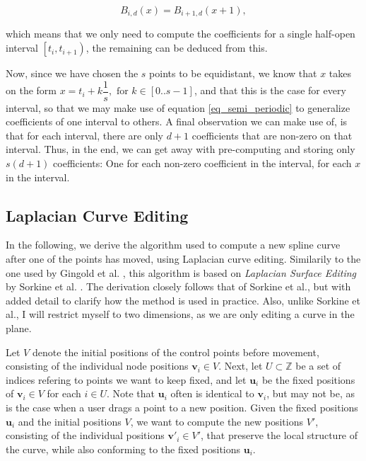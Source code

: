 \documentclass[english]{article}
\begin{document}
\begin{equation} \label{eq_semi_periodic}
B_{i,d}(x) = B_{i + 1,d}(x + 1),
\end{equation}

which means that we only need to compute the coefficients for a
  single half-open interval $\left[{t_i, t_{i + 1}}\right)$, the remaining can be deduced from this.
    
    Now, since we have chosen the $s$ points to be equidistant, we know that $x$ takes on the form $x = t_i + k \dfrac{1}{s}, \text{ for } k \in [0..{s-1}]$, and that this is the case for every interval, so that we may make use of equation \ref{eq_semi_periodic} to generalize coefficients of one interval to others. A final observation we can make use of, is that for each interval, there are only $d + 1$ coefficients that are non-zero on that interval. Thus, in the end, we can get away with pre-computing and storing only $s(d + 1)$ coefficients: One for each non-zero coefficient in the interval, for each $x$ in the interval.
    

\subsection{Laplacian Curve Editing} \label{section_laplacian}

In the following, we derive the algorithm used to compute a new spline curve after one of the points has moved, using Laplacian curve editing. Similarily to the one used by Gingold et al. \cite{gingold09}, this algorithm is based on \textit{Laplacian Surface Editing} by Sorkine et al. \cite{sorkine04}. The derivation closely follows that of Sorkine et al., but with added detail to clarify how the method is used in practice. Also, unlike Sorkine et al., I will restrict myself to two dimensions, as we are only editing a curve in the plane.

Let $V$ denote the initial positions of the control points before movement, consisting of the individual node positions $\mathbf{v}_i \in V$. Next, let $U \subset \mathbb{Z}$ be a set of indices refering to points we want to keep fixed, and let $\mathbf{u}_i$ be the fixed positions of $\mathbf{v}_i \in V$ for each $ i \in U$. Note that $\mathbf{u}_i$ often is identical to $\mathbf{v}_i$, but may not be, as is the case when a user drags a point to a new position. Given the fixed positions $\mathbf{u}_i$ and the initial positions $V$, we want to compute the new positions $V'$, consisting of the individual positions $\mathbf{v}'_i \in V'$, that preserve the local structure of the curve, while also conforming to the fixed positions $\mathbf{u}_i$.
\end{document}
